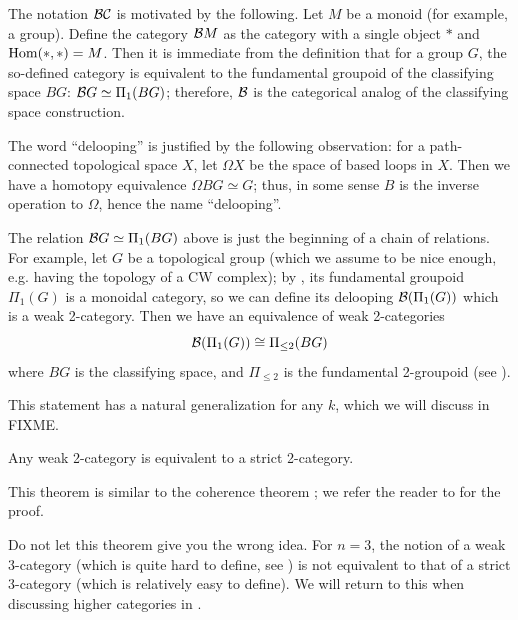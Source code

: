 \begin{remark}\label{r:BG}
    The notation $\mathcal{B}\mathcal{C}$ is motivated by the following. Let $M$ be a
    monoid (for example, a group). Define the category $\mathcal{B} M$ as the
    category with a single object $*$ and $\operatorname{Hom}(*,*)=M$. Then it is immediate
    from the definition that for a group $G$, the so-defined category is
    equivalent to the fundamental groupoid of the classifying space $BG$:
    $\mathcal{B} G\simeq \Pi_1(BG)$; therefore, $\mathcal{B}$ is the categorical analog of
    the classifying space construction.

  The word ``delooping'' is justified by the following observation: for a
  path-connected topological space $X$, let $\Omega X$ be the space of based
  loops in $X$. Then we have a homotopy equivalence $\Omega BG \simeq G$; thus,
  in some sense $B$ is the inverse operation to $\Omega$, hence the name
  ``delooping''.

  The relation $\mathcal{B} G\simeq \Pi_1(BG)$ above is just the beginning of a chain
  of relations. For example, let $G$ be a topological
  group (which we assume to be nice enough, e.g. having the topology of a CW
  complex); by , its fundamental groupoid $\Pi_1(G)$ is a
  monoidal category, so we can define its delooping $\mathcal{B} (\Pi_1(G))$ which is
  a weak 2-category. Then we have an equivalence of weak 2-categories
  \begin{equation}
    \mathcal{B} (\Pi_1(G))\cong \Pi_{\le 2}(BG)
  \end{equation}
  where $BG$ is the classifying space, and $\Pi_{\le 2}$ is the fundamental
  2-groupoid (see ).

  This statement has a natural generalization for any $k$, which we will
  discuss in FIXME.
\end{remark}

\begin{theorem}\label{t:strictify-bicategories}
  Any weak 2-category is equivalent to a strict 2-category.
\end{theorem}
This theorem is similar to the coherence theorem ; we refer
the reader to \cite[Theorem 1.5.15]{leinster} for the proof.

\begin{remark}\label{r:stictify-3-cat}
  Do not let this theorem give you the wrong idea. For $n=3$, the notion of a
  weak $3$-category (which is quite hard to define, see
  \cite{gordon-power-street}) is not equivalent to that of a strict 3-category
  (which is relatively easy to define). We will return to this when discussing
  higher categories in .
\end{remark}



